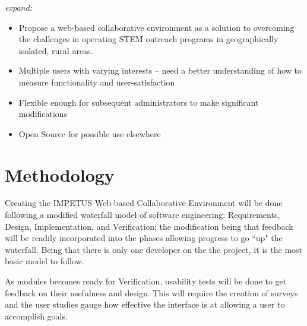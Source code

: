 \textit{expand:}
\begin{itemize}
	\item Propose a web-based collaborative environment as a solution to overcoming the challenges in operating STEM outreach programs in geographically isolated, rural areas. 
	\item Multiple users with varying interests -- need a better understanding of how to measure functionality and user-satisfaction
	\item Flexible enough for subsequent administrators to make significant modifications
	\item Open Source for possible use elsewhere
\end{itemize}

\section{Methodology}

Creating the IMPETUS Web-based Collaborative Environment will be done following a modified waterfall model of software engineering: Requirements, Design, Implementation, and Verification; the modification being that feedback will be readily incorporated into the phases allowing progress to go ``up" the waterfall. Being that there is only one developer on the the project, it is the most basic model to follow.

As modules becomes ready for Verification, usability tests will be done to get feedback on their usefulness and design. This will require the creation of surveys and the user studies gauge how effective the interface is at allowing a user to accomplish goals.
































